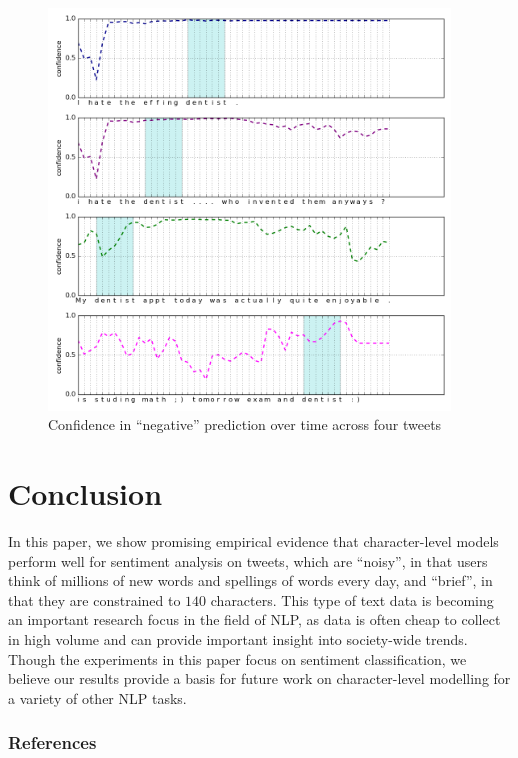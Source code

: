 \documentclass{article} %
\begin{document}
\begin{figure}[h!]
\label{fig:dentist}
\begin{center}
\includegraphics[width=0.95\textwidth]{figs/dentist}
\end{center}
\caption{Confidence in ``negative'' prediction over time across four tweets}
\end{figure}

\section{Conclusion}
In this paper, we show promising empirical evidence that character-level models perform well for sentiment analysis on tweets, which are ``noisy'', in that users think of millions of new words and spellings of words every day, and ``brief'', in that they are constrained to $140$ characters. This type of text data is becoming an important research focus in the field of NLP, as data is often cheap to collect in high volume and can provide important insight into society-wide trends. Though the experiments in this paper focus on sentiment classification, we believe our results provide a basis for future work on character-level modelling for a variety of other NLP tasks.


\subsubsection*{References}
\end{document}
